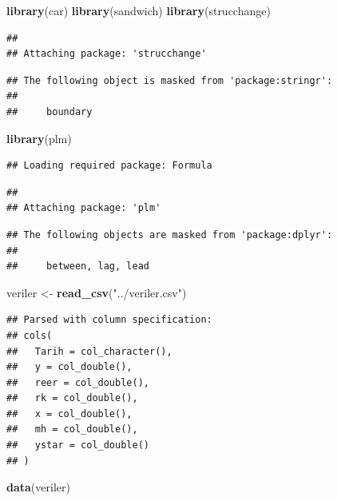 \documentclass[]{article}
\newenvironment{Shaded}{\begin{snugshade}}{\end{snugshade}}
\newcommand{\KeywordTok}[1]{\textcolor[rgb]{0.13,0.29,0.53}{\textbf{#1}}}
\newcommand{\StringTok}[1]{\textcolor[rgb]{0.31,0.60,0.02}{#1}}
\newcommand{\NormalTok}[1]{#1}
\begin{document}
\begin{Shaded}
\begin{Highlighting}[]
\KeywordTok{library}\NormalTok{(car)}
\KeywordTok{library}\NormalTok{(sandwich)}
\KeywordTok{library}\NormalTok{(strucchange)}
\end{Highlighting}
\end{Shaded}

\begin{verbatim}
## 
## Attaching package: 'strucchange'
\end{verbatim}

\begin{verbatim}
## The following object is masked from 'package:stringr':
## 
##     boundary
\end{verbatim}

\begin{Shaded}
\begin{Highlighting}[]
\KeywordTok{library}\NormalTok{(plm)}
\end{Highlighting}
\end{Shaded}

\begin{verbatim}
## Loading required package: Formula
\end{verbatim}

\begin{verbatim}
## 
## Attaching package: 'plm'
\end{verbatim}

\begin{verbatim}
## The following objects are masked from 'package:dplyr':
## 
##     between, lag, lead
\end{verbatim}

\begin{Shaded}
\begin{Highlighting}[]
\NormalTok{veriler <-}\StringTok{ }\KeywordTok{read_csv}\NormalTok{(}\StringTok{"../veriler.csv"}\NormalTok{)}
\end{Highlighting}
\end{Shaded}

\begin{verbatim}
## Parsed with column specification:
## cols(
##   Tarih = col_character(),
##   y = col_double(),
##   reer = col_double(),
##   rk = col_double(),
##   x = col_double(),
##   mh = col_double(),
##   ystar = col_double()
## )
\end{verbatim}

\begin{Shaded}
\begin{Highlighting}[]
\KeywordTok{data}\NormalTok{(veriler)}
\end{Highlighting}
\end{Shaded}
\end{document}
